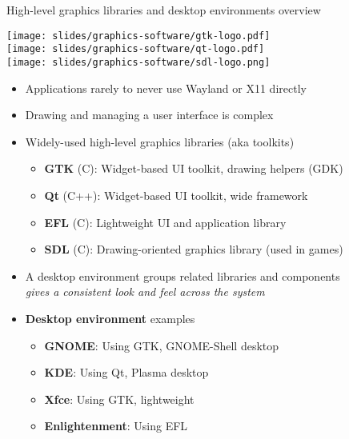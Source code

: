 \begin{frame}{High-level graphics libraries and desktop environments overview}
  \begin{minipage}[b]{0.09\textwidth}
  \centering
  \texttt{[image: slides/graphics-software/gtk-logo.pdf]}\\
  \vspace{3em}
  \texttt{[image: slides/graphics-software/qt-logo.pdf]}\\
  \vspace{3em}
  \texttt{[image: slides/graphics-software/sdl-logo.png]}\\
  \vspace{2em}
  \end{minipage}
  \hfill
  \begin{minipage}[b]{0.8\textwidth}
  \begin{itemize}
  \item Applications rarely to never use Wayland or X11 directly
  \item Drawing and managing a user interface is complex
  \item Widely-used high-level graphics libraries (aka toolkits)
    \begin{itemize}
    \item \textbf{GTK} (C): Widget-based UI toolkit, drawing helpers (GDK)
    \item \textbf{Qt} (C++): Widget-based UI toolkit, wide framework
    \item \textbf{EFL} (C): Lightweight UI and application library
    \item \textbf{SDL} (C): Drawing-oriented graphics library (used in games)
    \end{itemize}
  \item A desktop environment groups related libraries and components\\
  \textit{gives a consistent look and feel across the system}
  \item \textbf{Desktop environment} examples
    \begin{itemize}
    \item \textbf{GNOME}: Using GTK, GNOME-Shell desktop
    \item \textbf{KDE}: Using Qt, Plasma desktop
    \item \textbf{Xfce}: Using GTK, lightweight
    \item \textbf{Enlightenment}: Using EFL
    \end{itemize}
  \end{itemize}

\end{minipage}
\end{frame}
